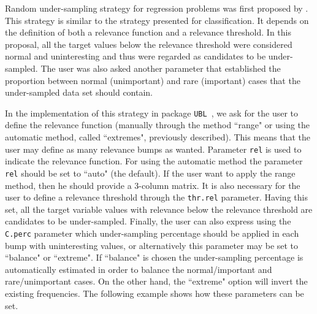 \documentclass[10pt,a4paper]{article}\usepackage[]{graphicx}\usepackage[]{color}
\newcommand{\pUBL}{package \texttt{UBL}\ }
\begin{document}
Random under-sampling strategy for regression problems was first proposed by \cite{torgo2013smote}. This strategy is similar to the strategy presented for classification. It depends on the definition of both a relevance function and a relevance threshold. In this proposal, all the target values below the relevance threshold were considered normal and uninteresting and thus were regarded as candidates to be under-sampled. The user was also asked another parameter that established the proportion between normal (unimportant) and rare (important) cases that the under-sampled data set should contain.


In the implementation of this strategy in \pUBL, we ask for the user to define the relevance function (manually through the method ``range" or using the automatic method, called ``extremes", previously described). This means that the user may define as many relevance bumps as wanted. Parameter \texttt{rel} is used to indicate the relevance function. For using the automatic method the parameter \texttt{rel} should be set to ``auto" (the default). If the user want to apply the range method, then he should provide a 3-column matrix. It is also necessary for the user to define a relevance threshold through the \texttt{thr.rel} parameter. Having this set, all the target variable values with relevance below the relevance threshold are candidates to be under-sampled. Finally, the user can also express using the \texttt{C.perc} parameter which under-sampling percentage should be applied in each bump with uninteresting values, or alternatively this parameter may be set to ``balance" or ``extreme". If ``balance" is chosen the under-sampling percentage is automatically estimated in order to balance the normal/important and rare/unimportant cases. On the other hand, the ``extreme" option will invert the existing frequencies. The following example shows how these parameters can be set.
\end{document}
